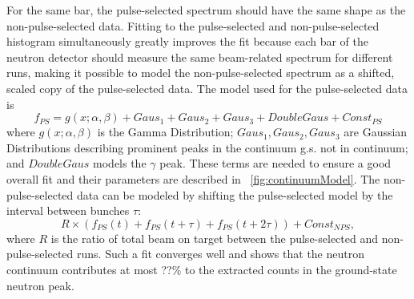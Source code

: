 For the same bar, the pulse-selected spectrum should have the same shape as the non-pulse-selected data.  Fitting to the pulse-selected and non-pulse-selected histogram simultaneously greatly improves the fit because each bar of the neutron detector should measure the same beam-related spectrum for different runs, making it possible to model the non-pulse-selected spectrum as a shifted, scaled copy of the pulse-selected data.  The model used for the pulse-selected data is
\begin{equation}
f_{PS} = g(x;\alpha,\beta) + Gaus_1 + Gaus_2 + Gaus_3 + DoubleGaus + Const_{PS}
\end{equation}
where $g(x;\alpha,\beta)$ is the Gamma Distribution; $Gaus_1, Gaus_2, Gaus_3$ are Gaussian Distributions describing prominent peaks in the continuum {g.s. not in continuum}; and $DoubleGaus$ models the $\gamma$ peak.  These terms are needed to ensure a good overall fit and their parameters are described in {\fig}~\ref{fig:continuumModel}.  The non-pulse-selected data can be modeled by shifting the pulse-selected model by the interval between bunches $\tau$:
\begin{equation}
R\times(f_{PS}(t) + f_{PS}(t+\tau) + f_{PS}(t+2\tau)) + Const_{NPS},
\label{eq:NPS_model}
\end{equation}
where $R$ is the ratio of total beam on target between the pulse-selected and non-pulse-selected runs.  Such a fit converges well and shows that the neutron continuum contributes at most ??\% to the extracted counts in the ground-state neutron peak.  

